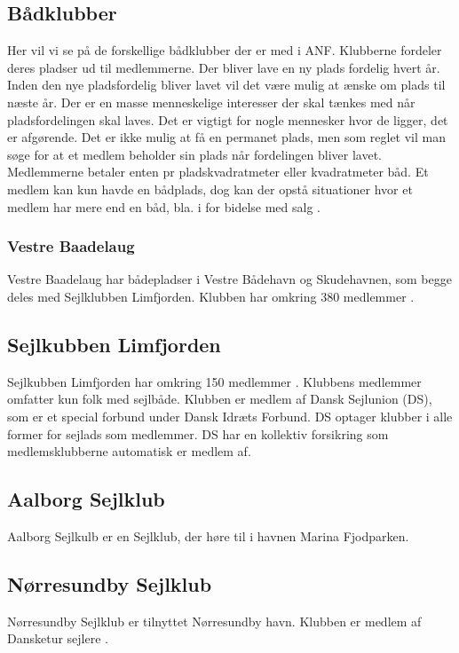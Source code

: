 \subsection{Bådklubber}
Her vil vi se på de forskellige bådklubber der er med i ANF. Klubberne fordeler deres pladser ud til medlemmerne. Der bliver lave en ny plads fordelig hvert år. Inden den nye pladsfordelig bliver lavet vil det være mulig at ænske om plads til næste år. Der er en masse menneskelige interesser der skal tænkes med når pladsfordelingen skal laves. Det er vigtigt for nogle mennesker hvor de ligger, det er afgørende. Det er ikke mulig at få en permanet plads, men som reglet vil man søge for at et medlem beholder sin plads når fordelingen bliver lavet. Medlemmerne betaler enten pr pladskvadratmeter eller kvadratmeter båd. Et medlem kan kun havde en bådplads, dog kan der opstå situationer hvor et medlem har mere end en båd, bla. i for bidelse med salg \cite{int_vb_sl}.

\subsubsection{Vestre Baadelaug}
Vestre Baadelaug har bådepladser i Vestre Bådehavn og Skudehavnen, som begge deles med Sejlklubben Limfjorden. Klubben har omkring 380 medlemmer \cite{int_vb_sl}. 

\subsection{Sejlkubben Limfjorden}
Sejlkubben Limfjorden har omkring 150 medlemmer \cite{int_vb_sl}. Klubbens medlemmer omfatter kun folk med sejlbåde. Klubben er medlem af Dansk Sejlunion (DS), som er et special forbund under Dansk Idræts Forbund. DS optager klubber i alle former for sejlads som medlemmer. DS har en kollektiv forsikring som medlemsklubberne automatisk er medlem af. 

\subsection{Aalborg Sejlklub}
Aalborg Sejlkulb er en Sejlklub, der høre til i havnen Marina Fjodparken.

\subsection{Nørresundby Sejlklub}
Nørresundby Sejlklub er tilnyttet Nørresundby havn. Klubben er medlem af Dansketur sejlere \cite{norresundby_sejlklub}.

